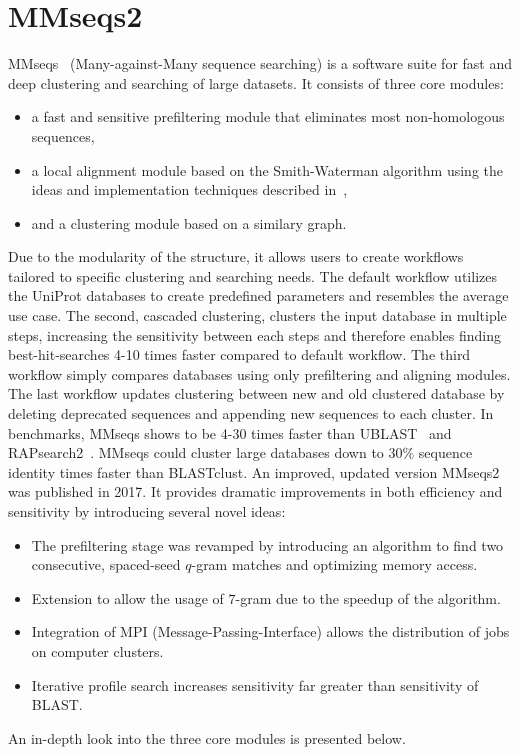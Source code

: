 \documentclass[twoside,a4paper,bsc]{master}
\newcommand{\Qgram}[1]{\(#1\)-gram}
\begin{document}
\section{MMseqs2}
MMseqs~\cite{hauser2014mmseqs} (Many-against-Many sequence searching) is a
software suite for fast
and deep clustering and searching of large datasets.
It consists of three core modules:
\begin{itemize}
\item a fast and sensitive preﬁltering module
that eliminates most non-homologous sequences,
\item a local alignment module based on the Smith-Waterman algorithm
using the ideas and implementation techniques described
in~\cite{Farrar:2007hs,ZHA:LEE:GAR:MAR:2013},
\item and a clustering module based on a
similary graph.
\end{itemize}
Due to the modularity of the structure, it allows users to
create workflows tailored to specific clustering and searching needs. The
default workflow utilizes the UniProt databases to create predefined
parameters and resembles the average use case. The second, cascaded
clustering, clusters the input database in multiple steps, increasing the
sensitivity between each steps and therefore enables finding
best-hit-searches 4-10 times faster compared to default workflow.
The third workflow simply compares
databases using only prefiltering and aligning modules. The last workflow
updates clustering between new and old clustered database by deleting
deprecated sequences and appending new sequences to each cluster.
In benchmarks, MMseqs shows to be 4-30 times faster than
UBLAST~\cite{edgar2010search} and RAPsearch2~\cite{zhao2012rapsearch2}.
MMseqs could cluster large databases down to 30\% sequence
identity  times faster than BLASTclust.
An improved, updated version MMseqs2~\cite{steinegger2017mmseqs2} was
published in 2017.
It provides dramatic improvements in both efficiency and sensitivity by
introducing several novel ideas:
\begin{itemize}
\item The prefiltering stage was revamped by
introducing an algorithm to find two consecutive, spaced-seed \Qgram{q}
matches
and optimizing memory access.
\item Extension to allow the usage of \Qgram{7} due to
the speedup of the algorithm.
\item Integration of MPI (Message-Passing-Interface) allows the
distribution of jobs on computer clusters.
\item Iterative profile search increases sensitivity far greater
than sensitivity of BLAST.
\end{itemize}
An in-depth look into the three core modules is presented below.
\end{document}
